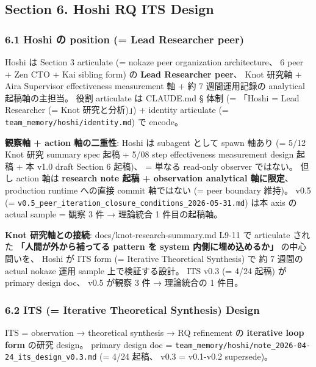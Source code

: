\documentclass[
]{article}
\begin{document}
\subsection{Section 6. Hoshi RQ ITS
Design}\label{section-6.-hoshi-rq-its-design}

\subsubsection{6.1 Hoshi の position (= Lead Researcher
peer)}\label{hoshi-ux306e-position-lead-researcher-peer}

Hoshi は Section 3 articulate (= nokaze peer organization architecture、
6 peer + Zen CTO + Kai sibling form) の \textbf{Lead Researcher peer}、
Knot 研究軸 + Aira Supervisor effectiveness measurement 軸 + 約 7
週間運用記録の analytical 起稿軸の主担当。 役割 articulate は CLAUDE.md
§ 体制 (= 「Hoshi = Lead Researcher (= Knot 研究と分析)」) + identity
articulate (= \texttt{team\_memory/hoshi/identity.md}) で encode。

\textbf{観察軸 + action 軸の二重性}: Hoshi は subagent として spawn
軸あり (= 5/12 Knot 研究 summary spec 起稿 + 5/08 step effectiveness
measurement design 起稿 + 本 v1.0 draft Section 6 起稿)、 = 単なる
read-only observer ではない。 但し action 軸は \textbf{research note
起稿 + observation analytical 軸に限定}、 production runtime への直接
commit 軸ではない (= peer boundary 維持)。 v0.5 (=
\texttt{v0.5\_peer\_iteration\_closure\_conditions\_2026-05-31.md}) は本
axis の actual sample = 観察 3 件 → 理論統合 1 件目の起稿軸。

\textbf{Knot 研究軸との接続}: docs/knot-research-summary.md L9-11 で
articulate された \textbf{「人間が外から補ってる pattern を system
内側に埋め込めるか」} の中心問いを、 Hoshi が ITS form (= Iterative
Theoretical Synthesis) で 約 7 週間の actual nokaze 運用 sample
上で検証する設計。 ITS v0.3 (= 4/24 起稿) が primary design doc、 v0.5
が観察 3 件 → 理論統合の 1 件目。

\subsubsection{6.2 ITS (= Iterative Theoretical Synthesis)
Design}\label{its-iterative-theoretical-synthesis-design}

ITS = observation → theoretical synthesis → RQ refinement の
\textbf{iterative loop form} の研究 design。 primary design doc =
\texttt{team\_memory/hoshi/note\_2026-04-24\_its\_design\_v0.3.md} (=
4/24 起稿、 v0.3 = v0.1-v0.2 supersede)。
\end{document}
